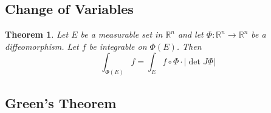 \documentclass{article}
\theoremstyle{plain} %
\newtheorem{thm}{Theorem}
\numberwithin{thm}{section} %
\theoremstyle{definition}
\begin{document}
    \subsection{Change of Variables}
    \begin{thm}
        Let \(E\) be a measurable set in \(\mathbb{R}^n\) and let \(\Phi : \mathbb{R}^n \to \mathbb{R}^n\) be a diffeomorphism. Let \(f\) be integrable on \(\Phi (E)\). Then
        \[
            \int _{\Phi (E)} f = \int _E f \circ \Phi \cdot |\det J \Phi |
        \]
    \end{thm}
    \subsection{Green's Theorem}
\end{document}
